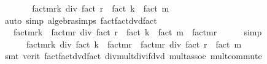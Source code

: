 \begin{isabellebody}
\ \ \isamarkupfalse%
\ \isamarkupfalse%
\ {\isachardoublequoteopen}{\isasymdots}\ {\isacharequal}{\kern0pt}\ fact{\isacharparenleft}{\kern0pt}m{\isacharplus}{\kern0pt}r{\isacharplus}{\kern0pt}k{\isacharparenright}{\kern0pt}\ div\ {\isacharparenleft}{\kern0pt}fact\ r\ {\isacharasterisk}{\kern0pt}\ {\isacharparenleft}{\kern0pt}fact\ k\ {\isacharasterisk}{\kern0pt}\ fact\ m{\isacharparenright}{\kern0pt}{\isacharparenright}{\kern0pt}{\isachardoublequoteclose}\isanewline
\ \ \ \ \isamarkupfalse%
\ {\isacharparenleft}{\kern0pt}auto\ simp{\isacharcolon}{\kern0pt}\ algebra{\isacharunderscore}{\kern0pt}simps\ fact{\isacharunderscore}{\kern0pt}fact{\isacharunderscore}{\kern0pt}dvd{\isacharunderscore}{\kern0pt}fact{\isacharparenright}{\kern0pt}\isanewline
\ \ \isamarkupfalse%
\ \isamarkupfalse%
\ {\isachardoublequoteopen}{\isasymdots}\ {\isacharequal}{\kern0pt}\ {\isacharparenleft}{\kern0pt}fact{\isacharparenleft}{\kern0pt}m{\isacharplus}{\kern0pt}r{\isacharplus}{\kern0pt}k{\isacharparenright}{\kern0pt}\ {\isacharasterisk}{\kern0pt}\ fact{\isacharparenleft}{\kern0pt}m{\isacharplus}{\kern0pt}r{\isacharparenright}{\kern0pt}{\isacharparenright}{\kern0pt}\ div\ {\isacharparenleft}{\kern0pt}fact\ r\ {\isacharasterisk}{\kern0pt}\ {\isacharparenleft}{\kern0pt}fact\ k\ {\isacharasterisk}{\kern0pt}\ fact\ m{\isacharparenright}{\kern0pt}\ {\isacharasterisk}{\kern0pt}\ fact{\isacharparenleft}{\kern0pt}m{\isacharplus}{\kern0pt}r{\isacharparenright}{\kern0pt}{\isacharparenright}{\kern0pt}{\isachardoublequoteclose}\isanewline
\ \ \ \ \isamarkupfalse%
\ simp\isanewline
\ \ \isamarkupfalse%
\ \isamarkupfalse%
\ {\isachardoublequoteopen}{\isasymdots}\ {\isacharequal}{\kern0pt}\isanewline
\ \ \ \ \ \ {\isacharparenleft}{\kern0pt}fact{\isacharparenleft}{\kern0pt}m{\isacharplus}{\kern0pt}r{\isacharplus}{\kern0pt}k{\isacharparenright}{\kern0pt}\ div\ {\isacharparenleft}{\kern0pt}fact\ k\ {\isacharasterisk}{\kern0pt}\ fact{\isacharparenleft}{\kern0pt}m{\isacharplus}{\kern0pt}r{\isacharparenright}{\kern0pt}{\isacharparenright}{\kern0pt}\ {\isacharasterisk}{\kern0pt}\ {\isacharparenleft}{\kern0pt}fact{\isacharparenleft}{\kern0pt}m{\isacharplus}{\kern0pt}r{\isacharparenright}{\kern0pt}\ div\ {\isacharparenleft}{\kern0pt}fact\ r\ {\isacharasterisk}{\kern0pt}\ fact\ m{\isacharparenright}{\kern0pt}{\isacharparenright}{\kern0pt}{\isacharparenright}{\kern0pt}{\isachardoublequoteclose}\isanewline
\ \ \ \ \isamarkupfalse%
\ {\isacharparenleft}{\kern0pt}smt\ {\isacharparenleft}{\kern0pt}verit{\isacharparenright}{\kern0pt}\ fact{\isacharunderscore}{\kern0pt}fact{\isacharunderscore}{\kern0pt}dvd{\isacharunderscore}{\kern0pt}fact\ div{\isacharunderscore}{\kern0pt}mult{\isacharunderscore}{\kern0pt}div{\isacharunderscore}{\kern0pt}if{\isacharunderscore}{\kern0pt}dvd\ mult{\isachardot}{\kern0pt}assoc\ mult{\isachardot}{\kern0pt}commute{\isacharparenright}{\kern0pt}\isanewline

\end{isabellebody}

